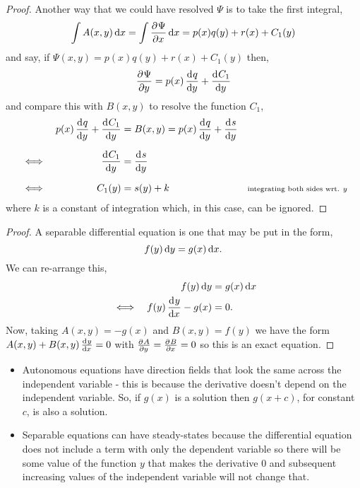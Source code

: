 \documentclass[../MathsNotesBase.tex]{subfiles}
\begin{document}
{\begin{tcolorbox}[breakable,enhanced jigsaw,colframe=white,colback=white,boxrule=0pt,arc=0pt,left=0pt,right=0pt,top=0pt,bottom=0pt]
\begin{proof}
				Another way that we could have resolved $\Psi$ is to take the first integral,
				\[ \int A(x,y) \dif x = \int \dpd{\Psi}{x} \dif x = p(x) q(y) + r(x) + C_1(y) \]
				and say, if ${ \Psi(x,y) = p(x) q(y) + r(x) + C_1(y) }$ then,
				\[ \dpd{\Psi}{y} = p(x) \dod{q}{y} + \dod{C_1}{y} \]
				and compare this with ${ B(x,y) }$ to resolve the function $C_1$,
				\begin{align*}
					&& p(x) \dod{q}{y} + \dod{C_1}{y} &= B(x,y) = p(x) \dod{q}{y} + \dod{s}{y} \nn
					&\iff & \dod{C_1}{y} &= \dod{s}{y} \nn
					&\iff & C_1(y) &= s(y) + k &\sidecomment{integrating both sides wrt. $y$}
				\end{align*}
				where $k$ is a constant of integration which, in this case, can be ignored.
			\end{proof}
		\end{tcolorbox}
	
		\medskip
		\begin{tcolorbox}[breakable,enhanced jigsaw,colframe=white,colback=white,boxrule=0pt,arc=0pt,left=0pt,right=0pt,top=0pt,bottom=0pt]
			\begin{proof}
				A separable differential equation is one that may be put in the form,
				\[ f(y) \dif y = g(x) \dif x. \]
				We can re-arrange this,
				\begin{align*}
					&& f(y) \dif y &= g(x) \dif x \\
					&\iff & f(y) \dod{y}{x} - g(x) &= 0.
				\end{align*}
				Now, taking ${ A(x,y) = -g(x) }$ and ${ B(x,y) = f(y) }$ we have the form ${ A(x,y) + B(x,y) \tod{y}{x} = 0 }$ with ${ \tpd{A}{y} = \tpd{B}{x} = 0 }$ so this is an exact equation.
			\end{proof}
		\end{tcolorbox}
		
		
		
		\biggerskip\biggerskip
		
		\begin{itemize}
			\item{Autonomous equations have direction fields that look the same across the independent variable - this is because the derivative doesn't depend on the independent variable. So, if $g(x)$ is a solution then $g(x+c)$, for constant $c$, is also a solution.}
			\item{Separable equations can have steady-states because the differential equation does not include a term with only the dependent variable so there will be some value of the function $y$ that makes the derivative 0 and subsequent increasing values of the independent variable will not change that.}
		\end{itemize}
		
}
\end{document}
